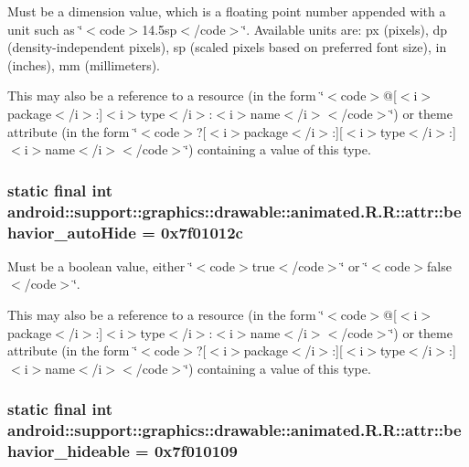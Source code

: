 Must be a dimension value, which is a floating point number appended with a unit such as \char`\"{}$<$code$>$14.5sp$<$/code$>$\char`\"{}. Available units are: px (pixels), dp (density-independent pixels), sp (scaled pixels based on preferred font size), in (inches), mm (millimeters). 

This may also be a reference to a resource (in the form \char`\"{}$<$code$>$@\mbox{[}$<$i$>$package$<$/i$>$:\mbox{]}$<$i$>$type$<$/i$>$:$<$i$>$name$<$/i$>$$<$/code$>$\char`\"{}) or theme attribute (in the form \char`\"{}$<$code$>$?\mbox{[}$<$i$>$package$<$/i$>$:\mbox{]}\mbox{[}$<$i$>$type$<$/i$>$:\mbox{]}$<$i$>$name$<$/i$>$$<$/code$>$\char`\"{}) containing a value of this type. \hypertarget{classandroid_1_1support_1_1graphics_1_1drawable_1_1animated_1_1_r_1_1attr_e141efd98d95c1adf0205d4886320d01}{
\subsubsection[{behavior\_\-autoHide}]{\setlength{\rightskip}{0pt plus 5cm}static final int android::support::graphics::drawable::animated.R.R::attr::behavior\_\-autoHide = 0x7f01012c}}
\label{classandroid_1_1support_1_1graphics_1_1drawable_1_1animated_1_1_r_1_1attr_e141efd98d95c1adf0205d4886320d01}


Must be a boolean value, either \char`\"{}$<$code$>$true$<$/code$>$\char`\"{} or \char`\"{}$<$code$>$false$<$/code$>$\char`\"{}. 

This may also be a reference to a resource (in the form \char`\"{}$<$code$>$@\mbox{[}$<$i$>$package$<$/i$>$:\mbox{]}$<$i$>$type$<$/i$>$:$<$i$>$name$<$/i$>$$<$/code$>$\char`\"{}) or theme attribute (in the form \char`\"{}$<$code$>$?\mbox{[}$<$i$>$package$<$/i$>$:\mbox{]}\mbox{[}$<$i$>$type$<$/i$>$:\mbox{]}$<$i$>$name$<$/i$>$$<$/code$>$\char`\"{}) containing a value of this type. \hypertarget{classandroid_1_1support_1_1graphics_1_1drawable_1_1animated_1_1_r_1_1attr_44af5fc84823c0faec075f4cf5be9d0b}{
\subsubsection[{behavior\_\-hideable}]{\setlength{\rightskip}{0pt plus 5cm}static final int android::support::graphics::drawable::animated.R.R::attr::behavior\_\-hideable = 0x7f010109}}
\label{classandroid_1_1support_1_1graphics_1_1drawable_1_1animated_1_1_r_1_1attr_44af5fc84823c0faec075f4cf5be9d0b}


